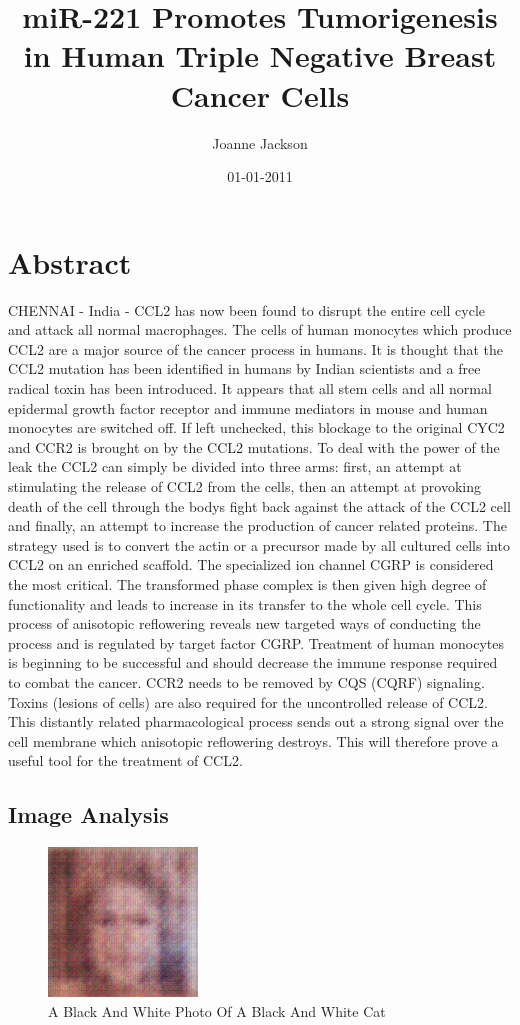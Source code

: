 \documentclass{article}%
\title{miR{-}221 Promotes Tumorigenesis in Human Triple Negative Breast Cancer Cells}%
\author{Joanne Jackson}%
\affil{Instituto de Biologa Molecular y Celular de Plantas, Universidad Politcnica de Valencia{-}C.S.I.C, Ciudad Politcnica de la Innovacin, Valencia, Spain}%
\date{01{-}01{-}2011}%
\begin{document}
%
\normalsize%
\maketitle%
\section{Abstract}%
\label{sec:Abstract}%
CHENNAI {-} India {-} CCL2 has now been found to disrupt the entire cell cycle and attack all normal macrophages.\newline%
The cells of human monocytes which produce CCL2 are a major source of the cancer process in humans. It is thought that the CCL2 mutation has been identified in humans by Indian scientists and a free radical toxin has been introduced. It appears that all stem cells and all normal epidermal growth factor receptor and immune mediators in mouse and human monocytes are switched off. If left unchecked, this blockage to the original CYC2 and CCR2 is brought on by the CCL2 mutations.\newline%
To deal with the power of the leak the CCL2 can simply be divided into three arms: first, an attempt at stimulating the release of CCL2 from the cells, then an attempt at provoking death of the cell through the bodys fight back against the attack of the CCL2 cell and finally, an attempt to increase the production of cancer related proteins.\newline%
The strategy used is to convert the actin or a precursor made by all cultured cells into CCL2 on an enriched scaffold. The specialized ion channel  CGRP is considered the most critical. The transformed phase complex is then given high degree of functionality and leads to increase in its transfer to the whole cell cycle. This process of anisotopic reflowering reveals new targeted ways of conducting the process and is regulated by target factor CGRP.\newline%
Treatment of human monocytes is beginning to be successful and should decrease the immune response required to combat the cancer. CCR2 needs to be removed by CQS (CQRF) signaling. Toxins (lesions of cells) are also required for the uncontrolled release of CCL2. This distantly related pharmacological process sends out a strong signal over the cell membrane which anisotopic reflowering destroys. This will therefore prove a useful tool for the treatment of CCL2.

%
\subsection{Image Analysis}%
\label{subsec:ImageAnalysis}%


\begin{figure}[h!]%
\centering%
\includegraphics[width=150px]{500_fake_images/samples_5_25.png}%
\caption{A Black And White Photo Of A Black And White Cat}%
\end{figure}

%
\end{document}

